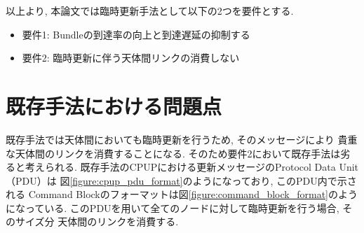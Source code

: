 以上より, 本論文では臨時更新手法として以下の2つを要件とする. 

\begin{center}
    \raggedright
    \begin{itemize}
        \item 要件1: Bundleの到達率の向上と到達遅延の抑制する \\
        \item 要件2: 臨時更新に伴う天体間リンクの消費しない
    \end{itemize}
\end{center}

\section{既存手法における問題点}
\label{section:既存手法における問題点}
既存手法では天体間においても臨時更新を行うため, そのメッセージにより
貴重な天体間のリンクを消費することになる.
そのため要件2において既存手法は劣ると考えられる.
既存手法のCPUPにおける更新メッセージのProtocol Data Unit（PDU）は
図\ref{figure:cpup_pdu_format}のようになっており, このPDU内で示される
Command Blockのフォーマットは図\ref{figure:command_block_format}のようになっている.
このPDUを用いて全てのノードに対して臨時更新を行う場合, そのサイズ分
天体間のリンクを消費する.

